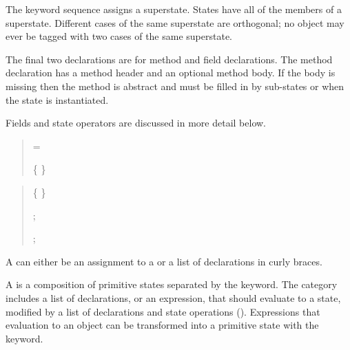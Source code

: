 The   keyword sequence assigns a superstate. States have 
all of the members of a superstate. Different cases of the same superstate 
are orthogonal; no object may ever be tagged with two cases of the same superstate.

The final two declarations are for method and field declarations.  The
method declaration has a method header
and an optional method body.  If the body is missing then
the method is abstract and must be filled in by sub-states or when the
state is instantiated.

Fields and state operators are discussed in more detail below.

\pagebreak

\begin{quote}


 = 

 \{  \}

\end{quote}

\begin{quote}


 {}  %


 \{  \}

 {} 

 {} 


 {}

 {}


 {}  ;

 {}    ;

\end{quote}

A  can either be an assignment to a  or
a list of declarations in curly braces.

A  is a composition of primitive states separated by the
 keyword.   The  category includes a list
of declarations, or an expression, that should evaluate to a state,
modified by a list of declarations and state operations ().  
Expressions that evaluation to an object can be transformed into a primitive state
with the  keyword. 

